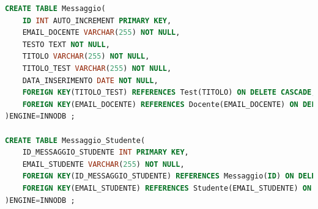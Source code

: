 \documentclass{article}
\begin{document}
\begin{lstlisting}[language=SQL, title=Codice SQL completo dello schema della base di dati.]
CREATE TABLE Messaggio(
    ID INT AUTO_INCREMENT PRIMARY KEY,
    EMAIL_DOCENTE VARCHAR(255) NOT NULL,
    TESTO TEXT NOT NULL,
    TITOLO VARCHAR(255) NOT NULL,
    TITOLO_TEST VARCHAR(255) NOT NULL,
    DATA_INSERIMENTO DATE NOT NULL,
    FOREIGN KEY(TITOLO_TEST) REFERENCES Test(TITOLO) ON DELETE CASCADE,
    FOREIGN KEY(EMAIL_DOCENTE) REFERENCES Docente(EMAIL_DOCENTE) ON DELETE CASCADE
)ENGINE=INNODB ;

CREATE TABLE Messaggio_Studente(
    ID_MESSAGGIO_STUDENTE INT PRIMARY KEY,
    EMAIL_STUDENTE VARCHAR(255) NOT NULL,
    FOREIGN KEY(ID_MESSAGGIO_STUDENTE) REFERENCES Messaggio(ID) ON DELETE CASCADE,
    FOREIGN KEY(EMAIL_STUDENTE) REFERENCES Studente(EMAIL_STUDENTE) ON DELETE CASCADE
)ENGINE=INNODB ;
\end{lstlisting}
\end{document}
